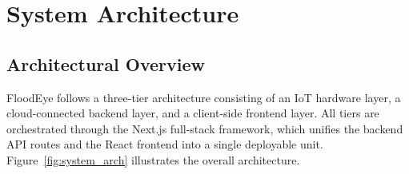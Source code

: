 \chapter{System Architecture}

\section{Architectural Overview}

FloodEye follows a three-tier architecture consisting of an IoT hardware layer, a cloud-connected backend layer, and a client-side frontend layer. All tiers are orchestrated through the Next.js full-stack framework, which unifies the backend API routes and the React frontend into a single deployable unit. Figure~\ref{fig:system_arch} illustrates the overall architecture.

